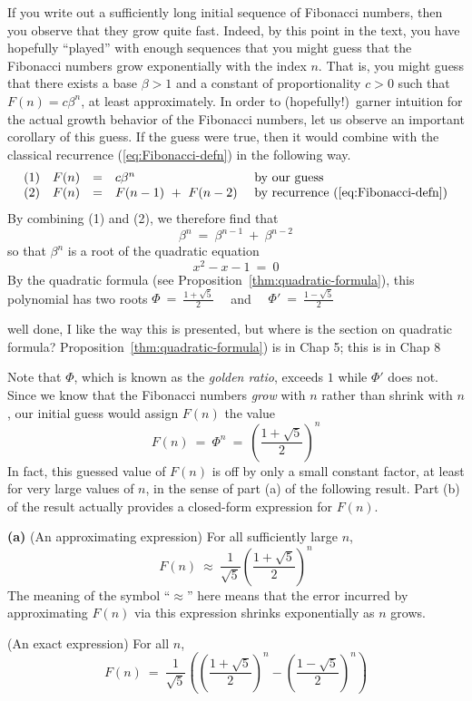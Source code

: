 If you write out a sufficiently long initial sequence of Fibonacci
numbers, then you observe that they grow quite fast.  Indeed, by this
point in the text, you have hopefully ``played'' with enough sequences
that you might guess that the Fibonacci numbers grow exponentially
with the index $n$.  That is, you might guess that there exists a base
$\beta > 1$ and a constant of proportionality $c > 0$ such that $F(n)
= c \beta^n$, at least approximately.  In order to (hopefully!)~garner
intuition for the actual growth behavior of the Fibonacci numbers, let
us observe an important corollary of this guess.  If the guess were
true, then it would combine with the classical recurrence
(\ref{eq:Fibonacci-defn}) in the following way.
\[ \begin{array}{cccll}
(1) & F(n) & = & c \beta^n
      & \mbox{ by our guess} \\
(2) & F(n) & = & F(n-1) \ + \ F(n-2)
      & \mbox{ by recurrence (\ref{eq:Fibonacci-defn})}
\end{array}
\]
By combining (1) and (2), we therefore find that
\[ \beta^n \ = \ \beta^{n-1} \ + \ \beta^{n-2} \]
so that $\beta^n$ is a root of the quadratic equation
\[
x^2 - x - 1 \ = \ 0
\]
By the quadratic formula (see
Proposition~\ref{thm:quadratic-formula}), this polynomial has two roots 
$\Phi \ = \ {\displaystyle \frac{1+\sqrt{5}}{2}}$ \ \ and \ \
$\Phi' \ = \ {\displaystyle \frac{1-\sqrt{5}}{2}}$

{\Denis well done, I like the way this is presented, but where is the
  section on quadratic formula?}
{\Arny Proposition~\ref{thm:quadratic-formula}) is in Chap 5; this is
  in Chap 8}


\noindent
Note that $\Phi$, which is known as the \textit{golden ratio},
 exceeds $1$ while $\Phi'$ does not.  Since we
know that the Fibonacci numbers {\em grow} with $n$ rather than shrink
with $n$, our initial guess would assign $F(n)$ the value
\[
F(n) \ = \ \Phi^n \ = \ {\displaystyle \left( \frac{1+\sqrt{5}}{2} \right)^n }
\]
In fact, this guessed value of $F(n)$ is off by only a small constant
factor, at least for very large values of $n$, in the sense of part
(a) of the following result.  Part (b) of the result actually provides
a closed-form expression for $F(n)$.

\begin{prop}
\label{thm:FibNo-GoldenRatio}
{\bf (a)} {\rm (An approximating expression)}
For all sufficiently large $n$,
\[ F(n) \ \approx \
\frac{1}{\sqrt{5}} \left(\frac{1+\sqrt{5}}{2} \right)^n
\]
The meaning of the symbol ``$\approx$'' here means that the error
incurred by approximating $F(n)$ via this expression shrinks
exponentially as $n$ grows.

\medskip

 {\rm (An exact expression)}
For all $n$,
\[ F(n) \ = \ 
\frac{1}{\sqrt{5}} \left( \left(\frac{1+\sqrt{5}}{2} \right)^n -
\left(\frac{1-\sqrt{5}}{2} \right)^n \right)
\]
\end{prop}


